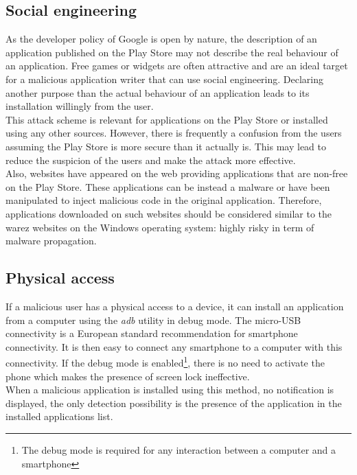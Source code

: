 \subsection{Social engineering}

As the developer policy of Google is open by nature, the description of an application published on the Play Store may not describe the real behaviour of an application.
Free games or widgets are often attractive and are an ideal target for a malicious application writer that can use social engineering.
Declaring another purpose than the actual behaviour of an application leads to its installation willingly from the user.\\

This attack scheme is relevant for applications on the Play Store or installed using any other sources.
However, there is frequently a confusion from the users assuming the Play Store is more secure than it actually is.
This may lead to reduce the suspicion of the users and make the attack more effective.\\

Also, websites have appeared on the web providing applications that are non-free on the Play Store.
These applications can be instead a malware or have been manipulated to inject malicious code in the original application.
Therefore, applications downloaded on such websites should be considered similar to the warez websites on the Windows operating system: highly risky in term of malware propagation.

\subsection{Physical access}

If a malicious user has a physical access to a device, it can install an application from a computer using the \emph{adb} utility in debug mode.
The micro-USB connectivity is a European standard recommendation for smartphone connectivity.
It is then easy to connect any smartphone to a computer with this connectivity.
If the debug mode is enabled\footnote{The debug mode is required for any interaction between a computer and a smartphone}, there is no need to activate the phone which makes the presence of screen lock ineffective.\\

When a malicious application is installed using this method, no notification is displayed, the only detection possibility is the presence of the application in the installed applications list.\\

